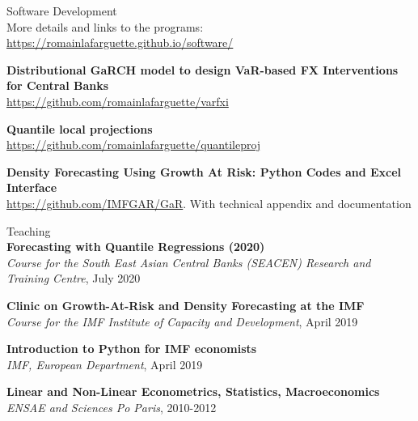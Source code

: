 \documentclass[usegeometry, 10pt, a4paper]{cv} %
\newcommand{\activite}[1]{\textbf{#1}\ }
\begin{document}
\begin{rubriquetableau}[0.95\textwidth]{Software Development}\\

More details and links to the programs: \url{https://romainlafarguette.github.io/software/}\\

\smallskip

\small
\activite{Distributional GaRCH model to design VaR-based FX Interventions for Central Banks} \\
\hspace{0.6cm} \small{\url{https://github.com/romainlafarguette/varfxi}}
\vspace{0.4cm} 

\small
\activite{Quantile local projections} \\
\hspace{0.6cm} \small{\url{https://github.com/romainlafarguette/quantileproj}}
\vspace{0.4cm} 

\small
\activite{Density Forecasting Using Growth At Risk: Python Codes and Excel Interface} \\
\hspace{0.6cm} \small{\url{https://github.com/IMFGAR/GaR}. With technical
  appendix and documentation}
\vspace{0.4cm} 
\end{rubriquetableau}

\vspace{0.8cm}

\begin{rubriquetableau}[0.95\textwidth]{Teaching}\\
\small
\activite{Forecasting with Quantile Regressions (2020)} \\
\hspace{0.6cm} \small{\emph{Course for the South East Asian Central Banks (SEACEN) Research and Training Centre}, July 2020 }
\vspace{0.4cm}

  
\small
\activite{Clinic on Growth-At-Risk and Density Forecasting at the IMF} \\
\hspace{0.6cm} \small{\emph{Course for the IMF Institute of Capacity and Development}, April 2019 }
\vspace{0.4cm}


\small
\activite{Introduction to Python for IMF economists} \\
\hspace{0.6cm} \small{\emph{IMF, European Department}, April 2019 }
\vspace{0.4cm} 


\small
\activite{Linear and Non-Linear Econometrics, Statistics, Macroeconomics} \\
\hspace{0.6cm} \small{\emph{ENSAE and Sciences Po Paris}, 2010-2012}
\vspace{0.4cm} 
\end{rubriquetableau}
\end{document}

